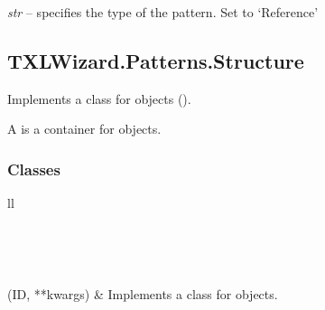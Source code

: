 \documentclass[letterpaper,10pt,english]{sphinxmanual}
\begin{document}
\begin{fulllineitems}
\begin{fulllineitems}
\end{fulllineitems}


\begin{fulllineitems}
\label{Chapters/PythonModuleReference/Patterns/TXLWizard.Patterns.Reference:TXLWizard.Patterns.Reference.Reference.Type}
\emph{str} -- specifies the type of the pattern. Set to `Reference'

\end{fulllineitems}


\end{fulllineitems}



\subsection{TXLWizard.Patterns.Structure}
\label{Chapters/PythonModuleReference/Patterns/TXLWizard.Patterns.Structure:module-TXLWizard.Patterns.Structure}\label{Chapters/PythonModuleReference/Patterns/TXLWizard.Patterns.Structure::doc}\label{Chapters/PythonModuleReference/Patterns/TXLWizard.Patterns.Structure:txlwizard-patterns-structure}
Implements a class for  objects ().

A  is a container for  objects.


\subsubsection{Classes}
\label{Chapters/PythonModuleReference/Patterns/TXLWizard.Patterns.Structure:classes}
\begin{longtable}{ll}
\hline
\endfirsthead

%
{{}} \\
\hline
\endhead

\hline {} \\ \hline
\endfoot

\endlastfoot


{\hyperref[Chapters/PythonModuleReference/Patterns/TXLWizard.Patterns.Structure:TXLWizard.Patterns.Structure.Structure]{}}(ID, **kwargs)
 & 
Implements a class for  objects.
\\
\hline\end{longtable}
\end{document}
